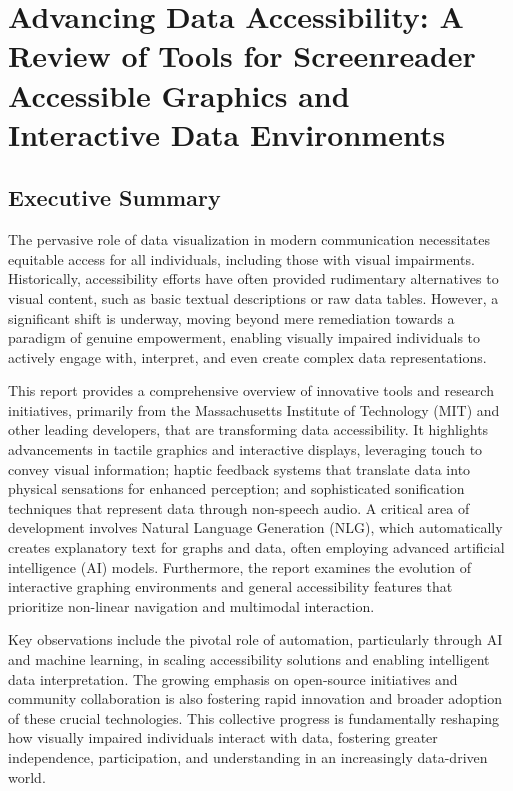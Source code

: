 \chapter{Advancing Data Accessibility: A Review of Tools for Screenreader Accessible Graphics and Interactive Data Environments}

\section{Executive Summary}
The pervasive role of data visualization in modern communication necessitates equitable access for all individuals, including those with visual impairments. Historically, accessibility efforts have often provided rudimentary alternatives to visual content, such as basic textual descriptions or raw data tables. However, a significant shift is underway, moving beyond mere remediation towards a paradigm of genuine empowerment, enabling visually impaired individuals to actively engage with, interpret, and even create complex data representations.

This report provides a comprehensive overview of innovative tools and research initiatives, primarily from the Massachusetts Institute of Technology (MIT) and other leading developers, that are transforming data accessibility. It highlights advancements in tactile graphics and interactive displays, leveraging touch to convey visual information; haptic feedback systems that translate data into physical sensations for enhanced perception; and sophisticated sonification techniques that represent data through non-speech audio. A critical area of development involves Natural Language Generation (NLG), which automatically creates explanatory text for graphs and data, often employing advanced artificial intelligence (AI) models. Furthermore, the report examines the evolution of interactive graphing environments and general accessibility features that prioritize non-linear navigation and multimodal interaction.

Key observations include the pivotal role of automation, particularly through AI and machine learning, in scaling accessibility solutions and enabling intelligent data interpretation. The growing emphasis on open-source initiatives and community collaboration is also fostering rapid innovation and broader adoption of these crucial technologies. This collective progress is fundamentally reshaping how visually impaired individuals interact with data, fostering greater independence, participation, and understanding in an increasingly data-driven world.

